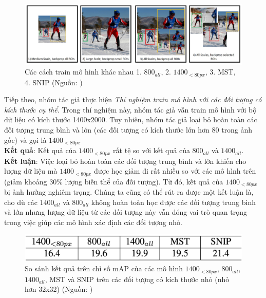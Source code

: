 {    \begin{figure}[H]
        \centering
        \includegraphics[width=15cm] {images/snip_model_compare}
        \caption{Các cách train mô hình khác nhau 1. ${800}_{all}$, 2. ${1400}_{<80px}$, 3. MST, 4. SNIP (Nguồn: \cite{singh2018analysis})}
        \label{fig:snip_model_compare}
    \end{figure}

    \noindent
    Tiếp theo, nhóm tác giả thực hiện \textit{Thí nghiệm train mô hình với các đối tượng có kích thước cụ thể}.
    Trong thí nghiệm này, nhóm tác giả vẫn train mô hình với bộ dữ liệu có kích thước 1400x2000.
    Tuy nhiên, nhóm tác giả loại bỏ hoàn toàn các đối tượng trung bình và lớn (các đối tượng có kích thước lớn hơn 80 trong ảnh gốc) và gọi là ${1400}_{<80px}$ \\
    \textbf{Kết quả}:
    Kết quả của ${1400}_{<80px}$ rất tệ so với kết quả của ${800}_{all}$ và ${1400}_{all}$. \\
    \textbf{Kết luận}:
    Việc loại bỏ hoàn toàn các đối tượng trung bình và lớn khiến cho lượng dữ liệu mà ${1400}_{<80px}$ được học giảm đi rất nhiều so với các mô hình trên (giảm khoảng 30\% lượng biến thể của đối tượng).
    Từ đó, kết quả của ${1400}_{<80px}$ bị ảnh hưởng nghiêm trọng.
    Chúng ta cũng có thể rút ra được một kết luận là, cho dù các ${1400}_{all}$ và ${800}_{all}$ không hoàn toàn học được các đối tượng trung bình và lớn nhưng lượng dữ liệu từ các đối tượng này vẫn đóng vai trò quan trọng trong việc giúp các mô hình xác định các đối tượng nhỏ.

    \begin{figure}[H]
        \centering
        \includegraphics[width=13cm] {images/snip_results_1}
        \caption{So sánh kết quả trên chỉ số mAP của các mô hình ${1400}_{<80px}$, ${800}_{all}$, ${1400}_{all}$, MST và SNIP trên các đối tượng có kích thước nhỏ (nhỏ hơn 32x32) (Nguồn: \cite{singh2018analysis})}
        \label{fig:snip_results_1}
    \end{figure}

}
